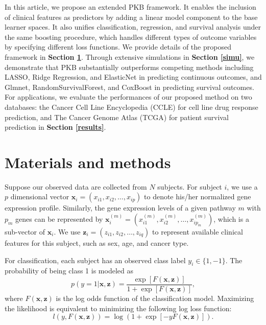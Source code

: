 \documentclass[a4paper,12pt]{article}
\newcommand{\bd}[1]{\mathbf{#1}}
\newcommand{\pathexpr}[3]{{#1}_{#2}^{(#3)}}
\begin{document}
In this article, we propose an extended PKB framework. It enables the inclusion of clinical features as predictors by adding a linear model component to the base learner spaces. It also unifies classification, regression, and survival analysis under the same boosting procedure, which handles different types of outcome variables by specifying different loss functions. We provide details of the proposed framework in \textbf{Section \ref{methods}}. Through extensive simulations in \textbf{Section \ref{simu}}, we demonstrate that PKB substantially outperforms competing methods including LASSO,\cite{tibshirani1996regression} Ridge Regression,\cite{hoerl1970ridge} and ElasticNet\cite{zou2005regularization} in predicting continuous outcomes, and Glmnet,\cite{simon2011regularization} RandomSurvivalForest,\cite{ishwaran2008random} and CoxBoost\cite{binder2013coxboost} in predicting survival outcomes. For applications, we evaluate the  performances of our proposed method on two databases:  the Cancer Cell Line Encyclopedia (CCLE) \cite{barretina2012cancer} for cell line drug response prediction, and The Cancer Genome Atlas (TCGA) \cite{tomczak2015tcga} for patient survival prediction in \textbf{Section \ref{results}}.

	\section{Materials and methods}\label{methods}
	Suppose our observed data are collected from $N$ subjects. For subject $i$, we use a $p$ dimensional vector $\bd{x}_i = (x_{i1}, x_{i2}, \ldots, x_{ip})$ to denote his/her normalized gene expression profile. Similarly, the gene expression levels of a given pathway $m$ with $p_m$ genes can be represented by $\pathexpr{\bd{x}}{i}{m} = (\pathexpr{x}{i1}{m},\pathexpr{x}{i2}{m}, \ldots, \pathexpr{x}{ip_m}{m})$, which is a sub-vector of $\bd{x}_i$. We use $\bd{z}_i = (z_{i1}, z_{i2}, \ldots, z_{iq})$ to represent available clinical features for this subject, such as sex, age, and cancer type.
	
	For classification, each subject has an observed class label $y_i \in \{1,-1\}$. The probability of being class 1 is modeled as 
	$$p(y = 1| \bd{x}, \bd{z}) = \frac{\exp[F(\bd{x}, \bd{z})]}{1 + \exp[F(\bd{x}, \bd{z})]},$$
	where $F(\bd{x}, \bd{z})$ is the log odds function of the classification model. Maximizing the likelihood is equivalent to minimizing the following log loss function:\cite{zeng2019pathway}
	$$l(y , F(\bd{x}, \bd{z}) ) = \log(1+\exp[-y F(\bd{x}, \bd{z})]).$$
	
\end{document}
